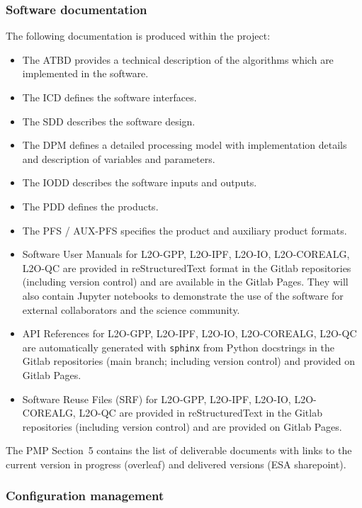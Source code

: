 \subsubsection{Software documentation}
The following documentation is produced within the project:
\begin{itemize}
    \item The ATBD provides a technical description of the algorithms which are implemented in the software.
    \item The ICD defines the software interfaces.
    \item The SDD describes the software design.
    \item The DPM defines a detailed processing model with implementation details and description of variables and parameters.
    \item The IODD describes the software inputs and outputs.
    \item The PDD defines the products.
    \item The PFS / AUX-PFS specifies the product and auxiliary product formats.
    \item Software User Manuals for L2O-GPP, L2O-IPF, L2O-IO, L2O-COREALG, L2O-QC are provided in reStructuredText format in the Gitlab repositories (including version control) and are available in the Gitlab Pages. They will also contain Jupyter notebooks to demonstrate the use of the software for external collaborators and the science community.
    \item API References for L2O-GPP, L2O-IPF, L2O-IO, L2O-COREALG, L2O-QC are automatically generated with \texttt{sphinx} from Python docstrings in the Gitlab repositories (main branch; including version control) and provided on Gitlab Pages.
    \item Software Reuse Files (SRF) for L2O-GPP, L2O-IPF, L2O-IO, L2O-COREALG, L2O-QC are provided in reStructuredText in the Gitlab repositories (including version control) and are provided on Gitlab Pages.
\end{itemize}

The PMP Section~5 contains the list of deliverable documents with links to the current version in progress (overleaf) and delivered versions (ESA sharepoint).

\subsubsection{Configuration management}
\label{subsec:configuration-management}

